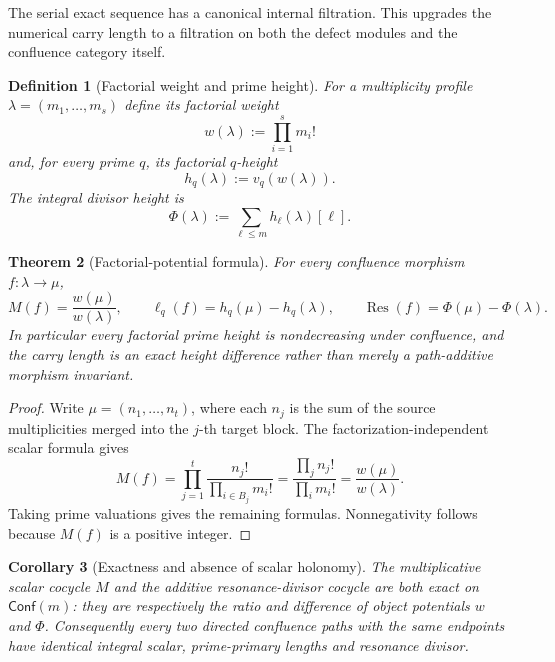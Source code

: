\documentclass[11pt]{article}
\newtheorem{theorem}{Theorem}[section]
\newtheorem{corollary}[theorem]{Corollary}
\newtheorem{definition}[theorem]{Definition}
\theoremstyle{remark}
\begin{document}
The serial exact sequence has a canonical internal filtration.  This upgrades the numerical carry
length to a filtration on both the defect modules and the confluence category itself.


\begin{definition}[Factorial weight and prime height]\label{P1C-def:factorial-height}
For a multiplicity profile $\lambda=(m_1,\ldots,m_s)$ define its factorial weight
\[
 \boxed{w(\lambda):=\prod_{i=1}^s m_i!}
\]
and, for every prime $q$, its factorial $q$-height
\[
 \boxed{h_q(\lambda):=v_q(w(\lambda)).}
\]
The integral divisor height is
\[
 \Phi(\lambda):=\sum_{\ell\le m}h_\ell(\lambda)[\ell].
\]
\end{definition}

\begin{theorem}[Factorial-potential formula]\label{P1C-thm:factorial-potential}
For every confluence morphism $f:\lambda\to\mu$,
\[
 \boxed{
 M(f)=\frac{w(\mu)}{w(\lambda)},
 \qquad
 \ell_q(f)=h_q(\mu)-h_q(\lambda),
 \qquad
 \operatorname{Res}(f)=\Phi(\mu)-\Phi(\lambda).}
\]
In particular every factorial prime height is nondecreasing under confluence, and the carry length is
an exact height difference rather than merely a path-additive morphism invariant.
\end{theorem}

\begin{proof}
Write $\mu=(n_1,\ldots,n_t)$, where each $n_j$ is the sum of the source multiplicities merged into
the $j$-th target block.  The factorization-independent scalar formula gives
\[
 M(f)=\prod_{j=1}^t\frac{n_j!}{\prod_{i\in B_j}m_i!}
 =\frac{\prod_j n_j!}{\prod_i m_i!}
 =\frac{w(\mu)}{w(\lambda)}.
\]
Taking prime valuations gives the remaining formulas.  Nonnegativity follows because $M(f)$ is a
positive integer.
\end{proof}

\begin{corollary}[Exactness and absence of scalar holonomy]\label{P1C-cor:factorial-no-holonomy}
The multiplicative scalar cocycle $M$ and the additive resonance-divisor cocycle are both exact on
$\mathsf{Conf}(m)$: they are respectively the ratio and difference of object potentials $w$ and
$\Phi$.  Consequently every two directed confluence paths with the same endpoints have identical
integral scalar, prime-primary lengths and resonance divisor.
\end{corollary}
\end{document}
